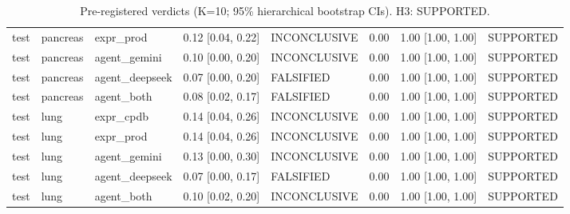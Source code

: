 \begin{table}[t]
\begin{tabular}{llllllll}
test & pancreas & expr\_prod & 0.12 [0.04, 0.22] & INCONCLUSIVE & 0.00 & 1.00 [1.00, 1.00] & SUPPORTED\\
test & pancreas & agent\_gemini & 0.10 [0.00, 0.20] & INCONCLUSIVE & 0.00 & 1.00 [1.00, 1.00] & SUPPORTED\\
test & pancreas & agent\_deepseek & 0.07 [0.00, 0.20] & FALSIFIED & 0.00 & 1.00 [1.00, 1.00] & SUPPORTED\\
test & pancreas & agent\_both & 0.08 [0.02, 0.17] & FALSIFIED & 0.00 & 1.00 [1.00, 1.00] & SUPPORTED\\
test & lung & expr\_cpdb & 0.14 [0.04, 0.26] & INCONCLUSIVE & 0.00 & 1.00 [1.00, 1.00] & SUPPORTED\\
test & lung & expr\_prod & 0.14 [0.04, 0.26] & INCONCLUSIVE & 0.00 & 1.00 [1.00, 1.00] & SUPPORTED\\
test & lung & agent\_gemini & 0.13 [0.00, 0.30] & INCONCLUSIVE & 0.00 & 1.00 [1.00, 1.00] & SUPPORTED\\
test & lung & agent\_deepseek & 0.07 [0.00, 0.17] & FALSIFIED & 0.00 & 1.00 [1.00, 1.00] & SUPPORTED\\
test & lung & agent\_both & 0.10 [0.02, 0.20] & INCONCLUSIVE & 0.00 & 1.00 [1.00, 1.00] & SUPPORTED\\
\bottomrule\end{tabular}
\caption{Pre-registered verdicts (K=10; 95\% hierarchical bootstrap CIs). H3: SUPPORTED.}\label{tab:verdicts}
\end{table}
